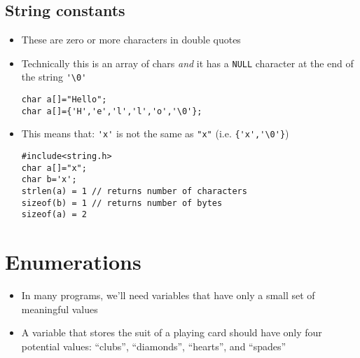 \documentclass{article}
\begin{document}
\subsection{String constants}
\begin{itemize}
\item These are zero or more characters in double quotes
\item Technically this is an array of chars \emph{and} it has a \verb!NULL! character at the end of the string \verb!'\0'!
\begin{verbatim}
char a[]="Hello";
char a[]={'H','e','l','l','o','\0'};
\end{verbatim}
\item This means that:
\verb!'x'! is not the same as \verb!"x"! (i.e. \verb!{'x','\0'}!)

\begin{verbatim}
#include<string.h>
char a[]="x";
char b='x';
strlen(a) = 1 // returns number of characters
sizeof(b) = 1 // returns number of bytes
sizeof(a) = 2
\end{verbatim}
\end{itemize}



\section{Enumerations}
\begin{itemize}
\item In many programs, we'll need variables that have only a small set of meaningful values

\item A variable that stores the suit of a playing card should have only four potential values: ``clubs'', ``diamonds'', ``hearts'', and ``spades''
\end{itemize}
\end{document}
